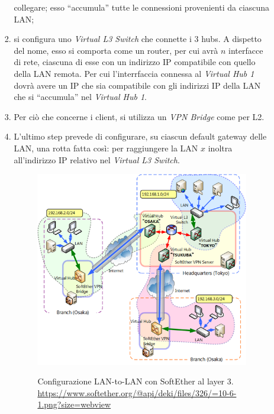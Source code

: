 \begin{itemize}
\begin{itemize}
\begin{enumerate}
      collegare; esso ``accumula'' tutte le connessioni provenienti da ciascuna LAN;
      \item si configura uno \textit{Virtual L3 Switch} che connette i 3 hubs. A dispetto del nome,
      esso si comporta come un router, per cui avrà $n$ interfacce di rete, ciascuna di esse con un
      indirizzo IP compatibile con quello della LAN remota. Per cui l'interrfaccia connessa al \textit{Virtual Hub 1}
      dovrà avere un IP che sia compatibile con gli indirizzi IP della LAN che si ``accumula'' nel \textit{Virtual
      Hub 1}.
      \item Per ciò che concerne i client, si utilizza un \textit{VPN Bridge} come
      per L2.
      \item L'ultimo step prevede di configurare, su ciascun default gateway delle LAN, una rotta fatta
      così: per raggiungere la LAN $x$ inoltra all'indirizzo IP relativo nel \textit{Virtual L3 Switch}.
      \begin{figure}
        \includegraphics[scale=0.45]{img/softether_l3_lan_to_lan}
        \label{fig:softether_l3_lan_to_lan}
        \caption[Configurazione LAN-to-LAN con SoftEther al layer 3]{Configurazione LAN-to-LAN con SoftEther al layer 3.
          \url{https://www.softether.org/@api/deki/files/326/=10-6-1.png?size=webview}}
      \end{figure}
    \end{enumerate}
  \end{itemize}
\end{itemize}
